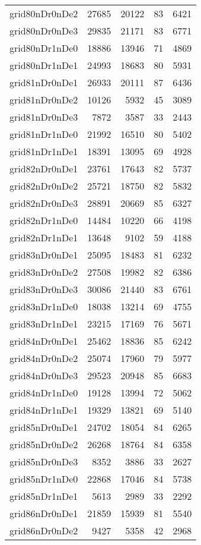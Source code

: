 \begin{tabular}{lrrrr}
grid80nDr0nDe2 & 27685 & 20122 & 83 & 6421 \\
grid80nDr0nDe3 & 29835 & 21171 & 83 & 6771 \\
grid80nDr1nDe0 & 18886 & 13946 & 71 & 4869 \\
grid80nDr1nDe1 & 24993 & 18683 & 80 & 5931 \\
grid81nDr0nDe1 & 26933 & 20111 & 87 & 6436 \\
grid81nDr0nDe2 & 10126 & 5932 & 45 & 3089 \\
grid81nDr0nDe3 & 7872 & 3587 & 33 & 2443 \\
grid81nDr1nDe0 & 21992 & 16510 & 80 & 5402 \\
grid81nDr1nDe1 & 18391 & 13095 & 69 & 4928 \\
grid82nDr0nDe1 & 23761 & 17643 & 82 & 5737 \\
grid82nDr0nDe2 & 25721 & 18750 & 82 & 5832 \\
grid82nDr0nDe3 & 28891 & 20669 & 85 & 6327 \\
grid82nDr1nDe0 & 14484 & 10220 & 66 & 4198 \\
grid82nDr1nDe1 & 13648 & 9102 & 59 & 4188 \\
grid83nDr0nDe1 & 25095 & 18483 & 81 & 6232 \\
grid83nDr0nDe2 & 27508 & 19982 & 82 & 6386 \\
grid83nDr0nDe3 & 30086 & 21440 & 83 & 6761 \\
grid83nDr1nDe0 & 18038 & 13214 & 69 & 4755 \\
grid83nDr1nDe1 & 23215 & 17169 & 76 & 5671 \\
grid84nDr0nDe1 & 25462 & 18836 & 85 & 6242 \\
grid84nDr0nDe2 & 25074 & 17960 & 79 & 5977 \\
grid84nDr0nDe3 & 29523 & 20948 & 85 & 6683 \\
grid84nDr1nDe0 & 19128 & 13994 & 72 & 5062 \\
grid84nDr1nDe1 & 19329 & 13821 & 69 & 5140 \\
grid85nDr0nDe1 & 24702 & 18054 & 84 & 6265 \\
grid85nDr0nDe2 & 26268 & 18764 & 84 & 6358 \\
grid85nDr0nDe3 & 8352 & 3886 & 33 & 2627 \\
grid85nDr1nDe0 & 22868 & 17046 & 84 & 5738 \\
grid85nDr1nDe1 & 5613 & 2989 & 33 & 2292 \\
grid86nDr0nDe1 & 21859 & 15939 & 81 & 5540 \\
grid86nDr0nDe2 & 9427 & 5358 & 42 & 2968 \\

\end{tabular}

